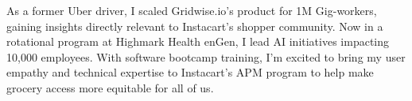 
{

    As a former Uber driver, I scaled Gridwise.io’s product for 1M Gig-workers, gaining insights directly relevant to Instacart’s shopper community. Now in a rotational program at Highmark Health enGen, I lead AI initiatives impacting 10,000 employees. With software bootcamp training, I’m excited to bring my user empathy and technical expertise to Instacart’s APM program to help make grocery access more equitable for all of us.
}